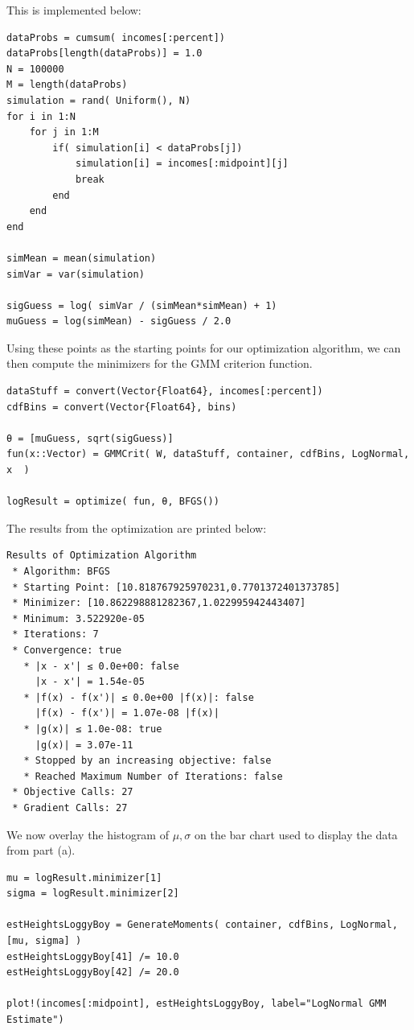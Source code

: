 \documentclass[12pt]{paper}
\begin{document}
This is implemented below:
\begin{verbatim}
dataProbs = cumsum( incomes[:percent])
dataProbs[length(dataProbs)] = 1.0
N = 100000
M = length(dataProbs)
simulation = rand( Uniform(), N)
for i in 1:N
    for j in 1:M
        if( simulation[i] < dataProbs[j])
            simulation[i] = incomes[:midpoint][j]
            break
        end
    end
end

simMean = mean(simulation)
simVar = var(simulation)

sigGuess = log( simVar / (simMean*simMean) + 1)
muGuess = log(simMean) - sigGuess / 2.0
\end{verbatim}

Using these points as the starting points for our optimization
algorithm, we can then compute the minimizers for the GMM criterion
function.

\begin{verbatim}
dataStuff = convert(Vector{Float64}, incomes[:percent])
cdfBins = convert(Vector{Float64}, bins)

θ = [muGuess, sqrt(sigGuess)]
fun(x::Vector) = GMMCrit( W, dataStuff, container, cdfBins, LogNormal, x  )

logResult = optimize( fun, θ, BFGS())
\end{verbatim}

The results from the optimization are printed below:

\begin{verbatim}
Results of Optimization Algorithm
 * Algorithm: BFGS
 * Starting Point: [10.818767925970231,0.7701372401373785]
 * Minimizer: [10.862298881282367,1.022995942443407]
 * Minimum: 3.522920e-05
 * Iterations: 7
 * Convergence: true
   * |x - x'| ≤ 0.0e+00: false 
     |x - x'| = 1.54e-05 
   * |f(x) - f(x')| ≤ 0.0e+00 |f(x)|: false
     |f(x) - f(x')| = 1.07e-08 |f(x)|
   * |g(x)| ≤ 1.0e-08: true 
     |g(x)| = 3.07e-11 
   * Stopped by an increasing objective: false
   * Reached Maximum Number of Iterations: false
 * Objective Calls: 27
 * Gradient Calls: 27
\end{verbatim}

We now overlay the histogram of $\mu,\sigma$ on the bar chart used to display
the data from part (a).
\begin{verbatim}
mu = logResult.minimizer[1]
sigma = logResult.minimizer[2]

estHeightsLoggyBoy = GenerateMoments( container, cdfBins, LogNormal, [mu, sigma] )
estHeightsLoggyBoy[41] /= 10.0
estHeightsLoggyBoy[42] /= 20.0

plot!(incomes[:midpoint], estHeightsLoggyBoy, label="LogNormal GMM Estimate")
\end{verbatim}
\end{document}
